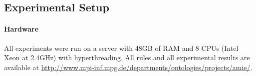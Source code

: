 

\subsection{Experimental Setup}\label{setup}

\paragraph{Hardware}
All experiments were run on a server with 48GB of RAM and 8 CPUs (Intel Xeon at 2.4GHz) with hyperthreading. 
All rules and all experimental results are available at \url{http://www.mpi-inf.mpg.de/departments/ontologies/projects/amie/}.

